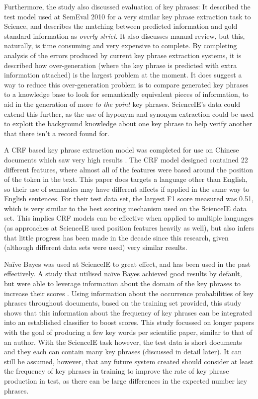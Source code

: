 Furthermore, the study also discussed evaluation of key phrases: It described the test model used at SemEval 2010 for a very similar key phrase extraction task to Science, and describes the matching between predicted information and gold standard information as \textit{overly strict}. It also discusses manual review, but this, naturally, is time consuming and very expensive to complete. By completing analysis of the errors produced by current key phrase extraction systems, it is described how over-generation (where the key phrase is predicted with extra information attached) is the largest problem at the moment. It does suggest a way to reduce this over-generation problem is to compare generated key phrases to a knowledge base to look for semantically equivalent pieces of information, to aid in the generation of more \textit{to the point} key phrases. ScienceIE's data could extend this further, as the use of hyponym and synonym extraction could be used to exploit the background knowledge about one key phrase to help verify another that there isn't a record found for.

A CRF based key phrase extraction model was completed for use on Chinese documents which saw very high results \cite{Zhang2008}. The CRF model designed contained 22 different features, where almost all of the features were based around the position of the token in the text. This paper does targets a language other than English, so their use of semantics may have different affects if applied in the same way to English sentences. For their test data set, the largest F1 score measured was 0.51, which is very similar to the best scoring mechanism used on the ScienceIE data set. This implies CRF models can be effective when applied to multiple languages (as approaches at ScienceIE used position features heavily as well), but also infers that little progress has been made in the decade since this research, given (although different data sets were used) very similar results. 

Naïve Bayes was used at ScienceIE to great effect, and has been used in the past effectively. A study that utilised naïve Bayes achieved good results by default, but were able to leverage information about the domain of the key phrases to increase their scores \cite{Wu2005}. Using information about the occurrence probabilities of key phrases throughout documents, based on the training set provided, this study shows that this information about the frequency of key phrases can be integrated into an established classifier to boost scores. This study focussed on longer papers with the goal of producing a few key words per scientific paper, similar to that of an author. With the ScienceIE task however, the test data is short documents and they each can contain many key phrases (discussed in detail later). It can still be assumed, however, that any future system created should consider at least the frequency of key phrases in training to improve the rate of key phrase production in test, as there can be large differences in the expected number key phrases.

